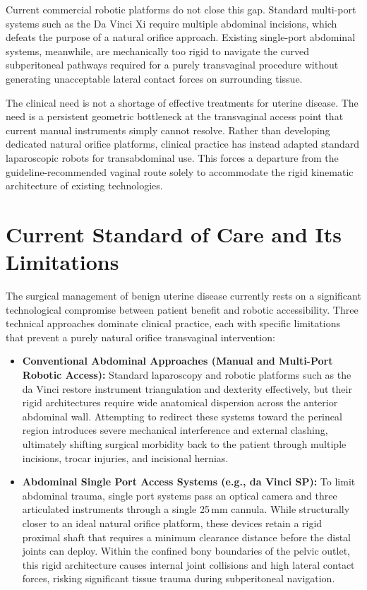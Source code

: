 \documentclass{article}
\begin{document}
Current commercial robotic platforms do not close this gap. Standard multi-port systems such as the Da Vinci Xi require multiple abdominal incisions, which defeats the purpose of a natural orifice approach. Existing single-port abdominal systems, meanwhile, are mechanically too rigid to navigate the curved subperitoneal pathways required for a purely transvaginal procedure without generating unacceptable lateral contact forces on surrounding tissue.

The clinical need is not a shortage of effective treatments for uterine disease. The need is a persistent geometric bottleneck at the transvaginal access point that current manual instruments simply cannot resolve. Rather than developing dedicated natural orifice platforms, clinical practice has instead adapted standard laparoscopic robots for transabdominal use. This forces a departure from the guideline-recommended vaginal route solely to accommodate the rigid kinematic architecture of existing technologies.

\section{Current Standard of Care and Its Limitations}

The surgical management of benign uterine disease currently rests on a significant technological compromise between patient benefit and robotic accessibility. Three technical approaches dominate clinical practice, each with specific limitations that prevent a purely natural orifice transvaginal intervention:

\begin{itemize}
\item \textbf{Conventional Abdominal Approaches (Manual and Multi-Port Robotic Access):} Standard laparoscopy and robotic platforms such as the da Vinci \cite{gargiulo2020evolution} restore instrument triangulation and dexterity effectively, but their rigid architectures require wide anatomical dispersion across the anterior abdominal wall. Attempting to redirect these systems toward the perineal region introduces severe mechanical interference and external clashing, ultimately shifting surgical morbidity back to the patient through multiple incisions, trocar injuries, and incisional hernias.

\item \textbf{Abdominal Single Port Access Systems (e.g., da Vinci SP):} \cite{palmer2021robotic} To limit abdominal trauma, single port systems pass an optical camera and three articulated instruments through a single 25\,mm cannula. While structurally closer to an ideal natural orifice platform, these devices retain a rigid proximal shaft that requires a minimum clearance distance before the distal joints can deploy. Within the confined bony boundaries of the pelvic outlet, this rigid architecture causes internal joint collisions and high lateral contact forces, risking significant tissue trauma during subperitoneal navigation.
\end{itemize}
\end{document}
